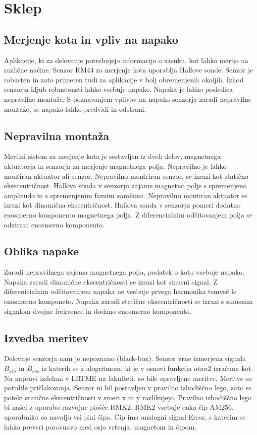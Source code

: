 \chapter{Sklep}
\section{Merjenje kota in vpliv na napako}
Aplikacije, ki za delovanje potrebujejo informacijo o zasuku, kot lahko merijo na različne načine. Senzor RM44 za merjenje kota uporablja Hallove sonde. Senzor je robusten in zato primeren tudi za aplikacije v bolj obremenjenih okoljih. Izhod senzorja kljub robustonsti lahko vsebuje napako. Napaka je lahko posledica nepravilne montaže. S poznavanjem vplivov na napako senzorja zaradi nepravilne montaže, se napako lahko predvidi in odstrani.
\section{Nepravilna montaža}
Merilni sistem za merjenje kota je sestavljen iz dveh delov, magnetnega aktuatorja in senzorja za merjenje magnetnega polja. Nepravilno je lahko montiran aktuator ali senzor.
Nepravilno montriran senzor, se izrazi kot statična eksecentričnost. Hallova sonda v senzorju zajame magnetno polje s spremenjeno amplitudo in s spremenjenim faznim zamikom.
 Nepravilno montiran aktuator se izrazi kot dinamična ekscentričnost. Hallova sonda v senzorju pomeri dodatno enosmerno komponento magnetnega polja. Z diferencialnim odčitavanjem polja se odstrani enosmerno komponento.
\section{Oblika napake}
Zaradi nepravilnega zajema magnetnega polja, podatek o kotu vsebuje napako. Napaka zaradi dinamične ekscentričnosti se izrazi kot sinusni signal. Z diferenicialnim odčitavanjem napaka ne vsebuje prvega harmonika temveč le enosmerno komponeto. Napaka zaradi statične ekscentričnosti se izrazi s sinusnim signalom dvojne frekvence in dodano enosmerno komponento.
\section{Izvedba meritev}
Delovnje senzorja nam je nepoznano (black-box). Senzor vrne izmerjena signala $B_{sin}$ in $B_{cos}$ iz katerih se z alogritmom, ki je v osnovi  funkcija $atan2$ izračuna kot. Na napravi izdelani v LRTME na fakulteti, so bile opravljene meritve. Meritve so potrdile pričlakovanja.  Senzor ni bil postavljen v pravilno izhodiščno lego, zato se poteki statične ekscentričnosti v smeri x in y razlikujejo. Pravilno izhodiščno lego bi našel  z uporabo razvojne plošče RMK2. RMK2 vsebuje enka čip AM256, uporabniku so navoljo vsi pini čipa. Čip ima analogni signal Error, s katerim se lahko preveri poravnavo med osjo vrtenja, magnetom in čipom.
